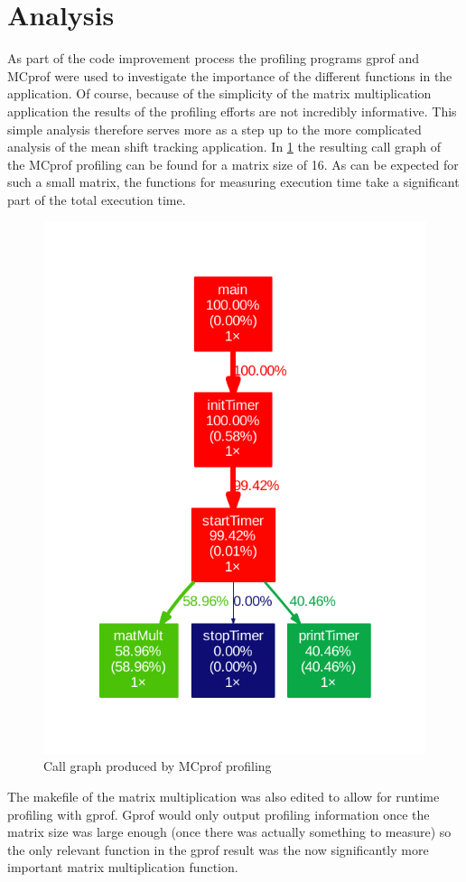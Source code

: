 \documentclass[final]{article}
\begin{document}
\section{Analysis}
As part of the code improvement process the profiling programs gprof and MCprof were used to investigate the importance of the different functions in the application. Of course, because of the simplicity of the matrix multiplication application the results of the profiling efforts are not incredibly informative. This simple analysis therefore serves more as a step up to the more complicated analysis of the mean shift tracking application. In \cref{fig:callgraphall} the resulting call graph of the MCprof profiling can be found for a matrix size of 16. As can be expected for such a small matrix, the functions for measuring execution time take a significant part of the total execution time.
\begin{figure}[H]
\centering
\includegraphics[scale=0.7]{resources/callgraphAll.pdf}
\caption{Call graph produced by MCprof profiling \cite{pdfthesisAshraf}}
\label{fig:callgraphall}
\end{figure}
The makefile of the matrix multiplication was also edited to allow for runtime profiling with gprof. Gprof would only output profiling information once the matrix size was large enough (once there was actually something to measure) so the only relevant function in the gprof result was the now significantly more important matrix multiplication function.
\end{document}

